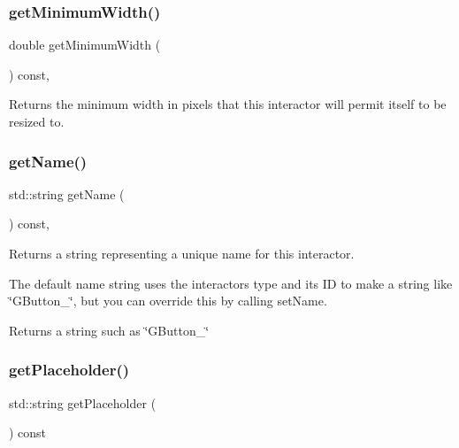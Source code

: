 \subsubsection{\texorpdfstring{get\+Minimum\+Width()}{getMinimumWidth()}}
{\footnotesize\ttfamily double get\+Minimum\+Width (\begin{DoxyParamCaption}{ }\end{DoxyParamCaption}) const\hspace{0.3cm}{\ttfamily [virtual]}, {\ttfamily [inherited]}}



Returns the minimum width in pixels that this interactor will permit itself to be resized to. 

\mbox{\label{classGInteractor_a8a60438a5b55d0b2ceb35c8674b9d8c5}} 
\subsubsection{\texorpdfstring{get\+Name()}{getName()}}
{\footnotesize\ttfamily std\+::string get\+Name (\begin{DoxyParamCaption}{ }\end{DoxyParamCaption}) const\hspace{0.3cm}{\ttfamily [virtual]}, {\ttfamily [inherited]}}



Returns a string representing a unique name for this interactor. 

The default name string uses the interactor\textquotesingle{}s type and its ID to make a string like \char`\"{}\+G\+Button\+\_\char`\"{}, but you can override this by calling set\+Name. \begin{DoxyReturn}{Returns}
a string such as \char`\"{}\+G\+Button\+\_\char`\"{} 
\end{DoxyReturn}
\mbox{\label{classGTextField_aa78dbaa7dac1f8cdf9048c91abecc7ad}} 
\subsubsection{\texorpdfstring{get\+Placeholder()}{getPlaceholder()}}
{\footnotesize\ttfamily std\+::string get\+Placeholder (\begin{DoxyParamCaption}{ }\end{DoxyParamCaption}) const\hspace{0.3cm}{\ttfamily [virtual]}}



